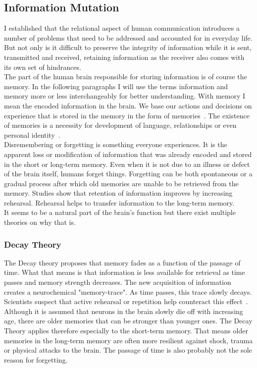 \subsection{Information Mutation}
I established that the relational aspect of human communication introduces a number of problems that need to be addressed and accounted for in everyday life. But not only is it difficult to preserve the integrity of information while it is sent, transmitted and received, retaining information as the receiver also comes with its own set of hindrances.\\
The part of the human brain responsible for storing information is of course the memory. In the following paragraphs I will use the terms information and memory more or less interchangeably for better understanding. With memory I mean the encoded information in the brain. We base our actions and decisions on experience that is stored in the memory in the form of memories~\cite{Sherwood2015}. The existence of memories is a necessity for development of language, relationships or even personal identity~\cite{Eysenck2012}.\\
Disremembering or forgetting is something everyone experiences. It is the apparent loss or modification of information that was already encoded and stored in the short or long-term memory. Even when it is not due to an illness or defect of the brain itself, humans forget things. Forgetting can be both spontaneous or a gradual process after which old memories are unable to be retrieved from the memory. Studies show that retention of information improves by increasing rehearsal. Rehearsal helps to transfer information to the long-term memory.~\cite{Weiten2021}\\
It seems to be a natural part of the brain's function but there exist multiple theories on why that is.
\subsubsection{Decay Theory}
The Decay theory proposes that memory fades as a function of the passage of time. What that means is that information is less available for retrieval as time passes and memory strength decreases. The new acquisition of information creates a neurochemical "memory-trace". As time passes, this trace slowly decays. Scientists suspect that active rehearsal or repetition help counteract this effect~\cite{Oberauer2008}. Although it is assumed that neurons in the brain slowly die off with increasing age, there are older memories that can be stronger than younger ones. The Decay Theory applies therefore especially to the short-term memory. That means older memories in the long-term memory are often more resilient against shock, trauma or physical attacks to the brain. The passage of time is also probably not the sole reason for forgetting.~\cite{Berman2009}
